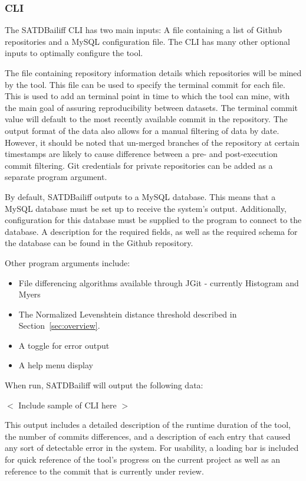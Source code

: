\documentclass[conference]{IEEEtran}
\begin{document}
\subsubsection{CLI}
The SATDBailiff CLI has two main inputs: A file containing a list of Github repositories and a MySQL configuration file. The CLI has many other optional inputs to optimally configure the tool.

The file containing repository information details which repositories will be mined by the tool. This file can be used to specify the terminal commit for each file. This is used to add an terminal point in time to which the tool can mine, with the main goal of assuring reproducibility between datasets. The terminal commit value will default to the most recently available commit in the repository. The output format of the data also allows for a manual filtering of data by date. However, it should be noted that un-merged branches of the repository at certain timestamps are likely to cause difference between a pre- and post-execution commit filtering. Git credentials for private repositories can be added as a separate program argument.

By default, SATDBailiff outputs to a MySQL database. This means that a MySQL database must be set up to receive the system's output. Additionally, configuration for this database must be supplied to the program to connect to the database. A description for the required fields, as well as the required schema for the database can be found in the Github repository.

Other program arguments include: 
\begin{itemize}
    \item File differencing algorithms available through JGit - currently Histogram and Myers
    \item The Normalized Levenshtein distance threshold described in Section~\ref{sec:overview}.
    \item A toggle for error output
    \item A help menu display 
\end{itemize}

When run, SATDBailiff will output the following data:

\vspace{4em}

$<$ Include sample of CLI here $>$

\vspace{4em}

This output includes a detailed description of the runtime duration of the tool, the number of commits differences, and a description of each entry that caused any sort of detectable error in the system. For usability, a loading bar is included for quick reference of the tool's progress on the current project as well as an reference to the commit that is currently under review.
\end{document}
